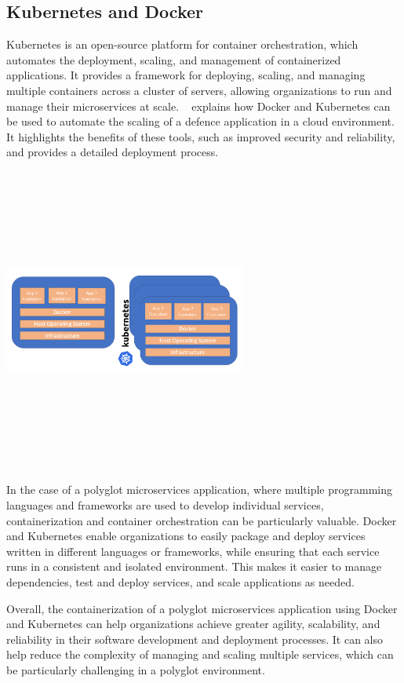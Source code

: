 \subsection{Kubernetes and Docker}
Kubernetes is an open-source platform for container orchestration, which automates the deployment, scaling, and management of containerized applications. It provides a framework for deploying, scaling, and managing multiple containers across a cluster of servers, allowing organizations to run and manage their microservices at scale.
~\cite{kho2018auto} explains how Docker and Kubernetes can be used to automate the scaling of a defence application in a cloud environment. It highlights the benefits of these tools, such as improved security and reliability, and provides a detailed deployment process.

\includegraphics[width=8cm, height=10cm]{docker-vs-kubernetes}

In the case of a polyglot microservices application, where multiple programming languages and frameworks are used to develop individual services, containerization and container orchestration can be particularly valuable. Docker and Kubernetes enable organizations to easily package and deploy services written in different languages or frameworks, while ensuring that each service runs in a consistent and isolated environment. This makes it easier to manage dependencies, test and deploy services, and scale applications as needed.

Overall, the containerization of a polyglot microservices application using Docker and Kubernetes can help organizations achieve greater agility, scalability, and reliability in their software development and deployment processes. It can also help reduce the complexity of managing and scaling multiple services, which can be particularly challenging in a polyglot environment.
